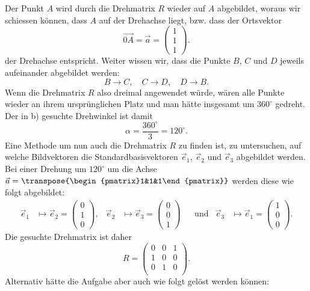 \begin{loesung}
\begin{teilaufgaben}
\item 
Der Punkt $A$ wird durch die Drehmatrix $R$ wieder auf $A$ abgebildet, woraus 
wir schiessen können, dass $A$ auf der Drehachse liegt, bzw. dass der 
Ortsvektor
\[
  \overrightarrow{0A}  = \vec{a}= \begin{pmatrix}1\\1\\1\end{pmatrix}.
\]
der Drehachse entspricht. Weiter wissen wir, dass die Punkte $B$, $C$ und $D$
jeweils aufeinander abgebildet werden:
\[
  B \rightarrow C,\quad
  C \rightarrow D,\quad
  D \rightarrow B.
\]
Wenn die Drehmatrix $R$ also dreimal angewendet würde, wären alle Punkte
wieder an ihrem ursprünglichen Platz und man hätte insgesamt um $360^\circ$ gedreht.
Der in b) gesuchte Drehwinkel ist damit
\[
  \alpha = \dfrac{360^\circ}{3} = 120^\circ.
\]
Eine Methode um nun auch die Drehmatrix $R$ zu finden ist, zu untersuchen,
auf welche Bildvektoren die Standardbasisvektoren $\vec e_1$, $\vec e_2$ und $\vec e_3$
abgebildet werden. 
Bei einer Drehung um $120^\circ$ um die Achse
$\vec a = \transpose{\begin{pmatrix}1&1&1\end{pmatrix}}$
werden diese wie folgt abgebildet:
\[
\begin{aligned}
\vec e_1&\mapsto \vec e_2 = \begin{pmatrix}0\\1\\0\end{pmatrix},
&
\vec e_2&\mapsto \vec e_3 = \begin{pmatrix}0\\0\\1\end{pmatrix}
&&\text{und}
&
\vec e_3&\mapsto \vec e_1 = \begin{pmatrix}1\\0\\0\end{pmatrix}.
\end{aligned}
\]
Die gesuchte Drehmatrix ist daher
\[
R
=
\begin{pmatrix}
0&0& 1\\
1&0& 0\\
0&1& 0\\
\end{pmatrix}.
\]
Alternativ hätte die Aufgabe aber auch wie folgt gelöst werden können:\\

\end{teilaufgaben}
\end{loesung}
